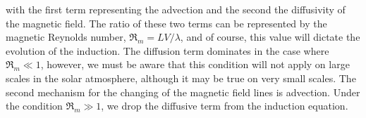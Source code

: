 \noindent with the first term representing the advection and the second the diffusivity of the magnetic field.
The ratio of these two terms can be represented by the magnetic Reynolds number, $\Re_m = LV/\lambda$, and of course, this value will dictate the evolution of the induction.
The diffusion term dominates in the case where $\Re_m \ll 1$, however, we must be aware that this condition will not apply on large scales in the solar atmosphere, although it may be true on very small scales.
The second mechanism for the changing of the magnetic field lines is advection. 
Under the condition $\Re_m \gg 1$, we drop the diffusive term from the induction equation.






